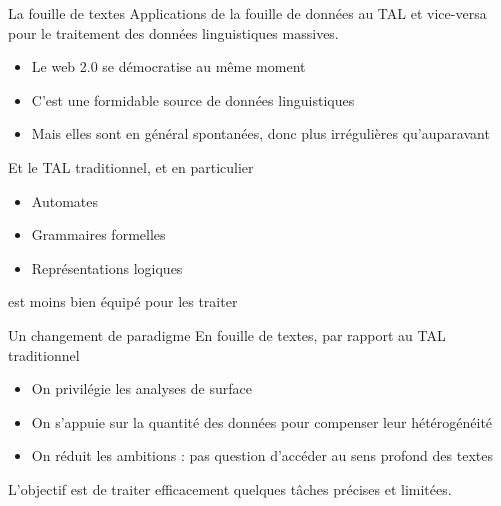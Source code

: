 \documentclass[hyperref={unicode}, xcolor={svgnames}, french]{beamer}
\begin{document}
\begin{frame}{La fouille de textes}
    Applications de la fouille de données au TAL et vice-versa pour le traitement des données linguistiques massives.

    \begin{itemize}
        \item Le web 2.0 se démocratise au même moment
        \item C'est une formidable source de données linguistiques
        \item Mais elles sont en général spontanées, donc plus \alert{irrégulières} qu'auparavant
    \end{itemize}

    Et le TAL traditionnel, et en particulier
    \begin{itemize}
        \item Automates
        \item Grammaires formelles
        \item Représentations logiques
    \end{itemize}
    est moins bien équipé pour les traiter
\end{frame}

\begin{frame}{Un changement de paradigme}
    En fouille de textes, par rapport au TAL traditionnel
    \begin{itemize}
        \item On privilégie les \alert{analyses de surface}
        \item On s'appuie sur la \alert{quantité des données} pour compenser leur hétérogénéité
        \item On réduit les ambitions : pas question d'accéder au sens profond des textes
    \end{itemize}

    L'objectif est de traiter efficacement quelques \alert{tâches} précises et limitées.
\end{frame}
\end{document}
